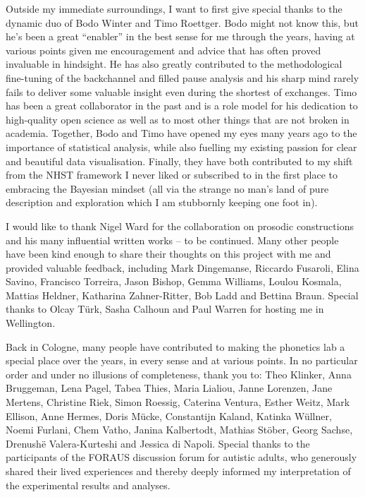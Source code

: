 Outside my immediate surroundings, I want to first give special thanks to the dynamic duo of Bodo Winter and Timo Roettger. Bodo might not know this, but he's been a great ``enabler'' in the best sense for me through the years, having at various points given me encouragement and advice that has often proved invaluable in hindsight. He has also greatly contributed to the methodological fine-tuning of the backchannel and filled pause analysis and his sharp mind rarely fails to deliver some valuable insight even during the shortest of exchanges. Timo has been a great collaborator in the past and is a role model for his dedication to high-quality open science as well as to most other things that are not broken in academia. Together, Bodo and Timo have opened my eyes many years ago to the importance of statistical analysis, while also fuelling my existing passion for clear and beautiful data visualisation. Finally, they have both contributed to my shift from the NHST framework I never liked or subscribed to in the first place to embracing the Bayesian mindset (all via the strange no man's land of pure description and exploration which I am stubbornly keeping one foot in).

I would like to thank Nigel Ward for the collaboration on prosodic constructions and his many influential written works -- to be continued. Many other people have been kind enough to share their thoughts on this project with me and provided valuable feedback, including Mark Dingemanse, Riccardo Fusaroli, Elina Savino, Francisco Torreira, Jason Bishop, Gemma Williams, Loulou Kosmala, Mattias Heldner, Katharina Zahner-Ritter, Bob Ladd and Bettina Braun. Special thanks to Olcay Türk, Sasha Calhoun and Paul Warren for hosting me in Wellington.

Back in Cologne, many people have contributed to making the phonetics lab a special place over the years, in every sense and at various points. In no particular order and under no illusions of completeness, thank you to: Theo Klinker, Anna Bruggeman, Lena Pagel, Tabea Thies, Maria Lialiou, Janne Lorenzen, Jane Mertens, Christine Riek, Simon Roessig, Caterina Ventura, Esther Weitz, Mark Ellison, Anne Hermes, Doris Mücke, Constantijn Kaland, Katinka Wüllner, Noemi Furlani, Chem Vatho, Janina Kalbertodt, Mathias Stöber, Georg Sachse, Drenushë Valera-Kurteshi and Jessica di Napoli. Special thanks to the participants of the FORAUS discussion forum for autistic adults, who generously shared their lived experiences and thereby deeply informed my interpretation of the experimental results and analyses. 

